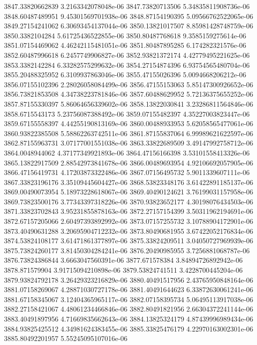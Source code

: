 {3847.33820662839 3.2163342078048e-06
3847.73820713506 5.34835811908736e-06
3848.60487489951 9.45301569701938e-06
3848.87154190395 5.09566762522065e-06
3849.27154241062 6.30693454137044e-06
3850.13821017507 8.85981428748759e-06
3850.3382104284 5.61725436522855e-06
3850.80487768618 9.3585159275614e-06
3851.07154469062 4.46242115481051e-06
3851.80487895285 6.174282321576e-06
3852.60487996618 6.2457749906827e-06
3852.93821372174 4.42779495221625e-06
3853.3382142284 6.33282575299632e-06
3854.27154874396 6.93754565480704e-06
3855.20488325952 6.3109937863046e-06
3855.47155026396 5.0094668206212e-06
3856.07155102396 2.28026058084499e-06
3856.47155153063 5.85147300926652e-06
3856.73821853508 4.34738223781846e-06
3857.60488629952 5.72136375655252e-06
3857.87155330397 5.86064656339602e-06
3858.13822030841 3.23286811564846e-06
3858.6715543173 5.23756087388492e-06
3859.07155482397 4.35227003823447e-06
3859.67155558397 4.44255190813169e-06
3860.00488933953 5.62058565477061e-06
3860.93822385508 5.58862263742511e-06
3861.87155837064 6.99989621622597e-06
3862.87155963731 3.07177001551038e-06
3863.33822689509 3.49147992758712e-06
3864.0048944062 4.37177349921893e-06
3864.47156166398 3.53101558413326e-06
3865.13822917509 2.88542973841678e-06
3866.00489693954 4.92106692057905e-06
3866.47156419731 4.17203873322486e-06
3867.07156495732 5.9011339607111e-06
3867.33823196176 3.35109445604427e-06
3868.53823348176 3.61422891185137e-06
3869.00490073954 5.18973228618067e-06
3869.40490124621 3.76199031157958e-06
3869.73823500176 3.77343397318226e-06
3870.93823652177 4.30198076434503e-06
3871.33823702843 3.95231855878163e-06
3872.27157154399 3.50311962194691e-06
3872.67157205066 2.60497393892992e-06
3873.07157255732 3.10788904172901e-06
3873.40490631288 3.20695904712232e-06
3873.80490681955 3.67422052176834e-06
3874.53824108177 3.61471861377897e-06
3875.33824209511 3.04050727969939e-06
3875.73824260177 3.81450304284241e-06
3876.20490985955 3.7256881068787e-06
3876.73824386844 3.6663047560391e-06
3877.671578384 3.84894726892942e-06
3878.871579904 3.91715094210898e-06
3879.53824741511 3.4228700445204e-06
3879.93824792178 3.26429323216829e-06
3880.40491517956 2.43765950848164e-06
3881.07158269067 4.28871030727178e-06
3881.40491644623 6.33872630061241e-06
3881.67158345067 3.12404365965117e-06
3882.07158395734 5.06495113917038e-06
3882.27158421067 4.48061234466846e-06
3882.80491821956 2.66304372241144e-06
3883.40491897956 4.71669835662643e-06
3884.13825324179 4.87439996989434e-06
3884.93825425512 4.34981624383455e-06
3885.33825476179 4.22970163002301e-06
3885.80492201957 5.55245095107016e-06
}
